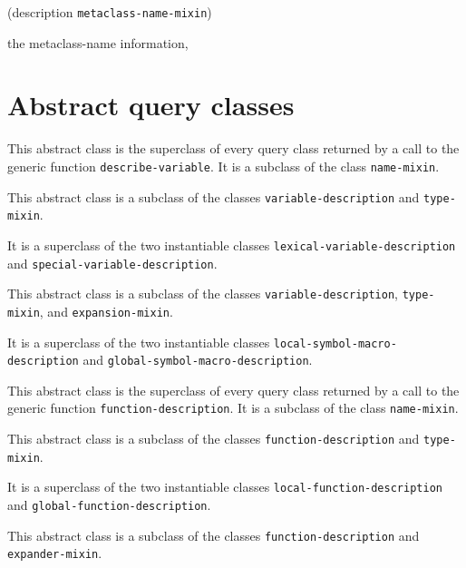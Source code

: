 {\footnotesize
{} {(description {\tt metaclass-name-mixin})}
}

 the metaclass-name information, 

\section{Abstract query classes}

{\footnotesize
{}
}

This abstract class is the superclass of every query class returned by
a call to the generic function \texttt{describe-variable}.  It is a
subclass of the class \texttt{name-mixin}.

{\footnotesize
{}
}

This abstract class is a subclass of the classes
\texttt{variable-description} and \texttt{type-mixin}.

It is a superclass of the two instantiable classes
\texttt{lexical-variable-description} and
\texttt{special-variable-description}.

{\footnotesize
{}
}

This abstract class is a subclass of the classes
\texttt{variable-description}, \texttt{type-mixin}, and
\texttt{expansion-mixin}.

It is a superclass of the two instantiable classes
\texttt{local-symbol-macro-description} and
\texttt{global-symbol-macro-description}.

{\footnotesize
{}
}

This abstract class is the superclass of every query class returned by
a call to the generic function \texttt{function-description}.  It is a
subclass of the class \texttt{name-mixin}.

{\footnotesize
{}
}

This abstract class is a subclass of the classes
\texttt{function-description} and \texttt{type-mixin}.

It is a superclass of the two instantiable classes
\texttt{local-function-description} and
\texttt{global-function-description}.

{\footnotesize
{}
}

This abstract class is a subclass of the classes
\texttt{function-description} and \texttt{expander-mixin}.

